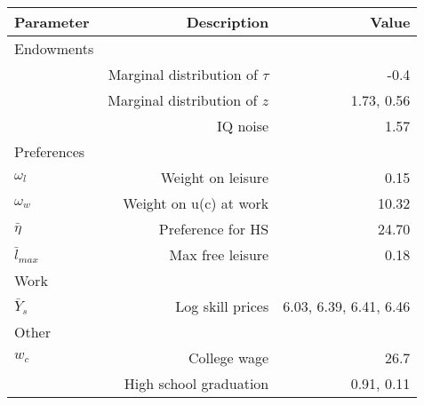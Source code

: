 \begin{tabular}{lrr}
\hline
Parameter & Description  & Value  \\ 
\hline
Endowments &   &   \\ 
 & Marginal distribution of $\tau$  & -0.4  \\ 
 & Marginal distribution of $z$  & 1.73, 0.56  \\ 
 & IQ noise  & 1.57  \\ 
Preferences &   &   \\ 
$\omega_{l}$ & Weight on leisure  & 0.15  \\ 
$\omega_{w}$ & Weight on u(c) at work  & 10.32  \\ 
$\bar{\eta}$ & Preference for HS  & 24.70  \\ 
$\bar{l}_{max}$ & Max free leisure  & 0.18  \\ 
Work &   &   \\ 
$\bar{Y}_{s}$ & Log skill prices  & 6.03, 6.39, 6.41, 6.46  \\ 
Other &   &   \\ 
$w_{c}$ & College wage  & 26.7  \\ 
 & High school graduation  & 0.91, 0.11  \\ 
\hline
\end{tabular}%
